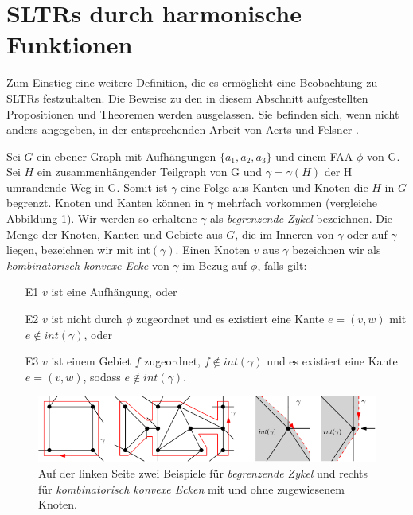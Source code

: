 \section{SLTRs durch harmonische Funktionen}\label{harmonic_approach}

Zum Einstieg eine weitere Definition, die es ermöglicht eine Beobachtung zu SLTRs festzuhalten. Die Beweise zu den in diesem Abschnitt aufgestellten Propositionen und Theoremen werden ausgelassen. Sie befinden sich, wenn nicht anders angegeben, in der entsprechenden Arbeit von Aerts und Felsner \cite{af13}.

\begin{definition}\label{def_ccc}
Sei $G$ ein ebener Graph mit Aufhängungen $\{a_1,a_2,a_3\}$ und einem FAA $\phi$ von G. Sei $H$ ein zusammenhängender Teilgraph von G und $\gamma=\gamma(H)$ der H umrandende Weg in G. Somit ist $\gamma$ eine Folge aus Kanten und Knoten die $H$ in $G$ begrenzt. Knoten und Kanten können in $\gamma$ mehrfach vorkommen (vergleiche Abbildung \ref{corner_def}). Wir werden so erhaltene $\gamma$ als \textit{begrenzende Zykel} bezeichnen. Die Menge der Knoten, Kanten und Gebiete aus $G$, die im Inneren von $\gamma$ oder auf $\gamma$ liegen, bezeichnen wir mit int$(\gamma)$. Einen Knoten $v$ aus $\gamma$ bezeichnen wir als \textit{kombinatorisch konvexe Ecke} von $\gamma$ im Bezug auf $\phi$, falls gilt:
\begin{itemize}
\item [E1] $v$ ist eine Aufhängung, oder
\item [E2] $v$ ist nicht durch $\phi$ zugeordnet und es existiert eine Kante $e = (v,w)$ mit $e \notin int(\gamma)$, oder
\item [E3] $v$ ist einem Gebiet $f$ zugeordnet, $f \notin int(\gamma)$ und es existiert eine Kante $e = (v,w)$, sodass $e \notin int(\gamma)$.
\end{itemize}
\end{definition}

\begin{figure}[h]
	\centering
  \includegraphics[width=1\textwidth]{corner_def.png}
  \caption{Auf der linken Seite zwei Beispiele für \textit{begrenzende Zykel} und rechts für \textit{kombinatorisch konvexe Ecken} mit und ohne zugewiesenem Knoten.}
  \label{corner_def}
\end{figure}

